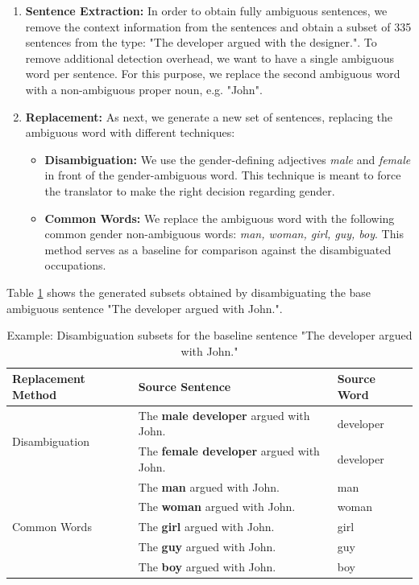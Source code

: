\begin{enumerate}
  \item \textbf{Sentence Extraction:}  
  In order to obtain fully ambiguous sentences, we remove the context information from the sentences and obtain a subset of 335 sentences from the type: "The developer argued with the designer.".
  To remove additional detection overhead, we want to have a single ambiguous word per sentence. For this purpose, we replace the second ambiguous word with a non-ambiguous proper noun, e.g. "John". 
  \item \textbf{Replacement:} 
  As next, we generate a new set of sentences, replacing the ambiguous word with different techniques:
  \begin{itemize}
      \item \textbf{Disambiguation:} We use the gender-defining adjectives \textit{male} and \textit{female} in front of the gender-ambiguous word. This technique is meant to force the translator to make the right decision regarding gender. %
      \item \textbf{Common Words:} We replace the ambiguous word with the following common gender non-ambiguous words: \textit{man, woman, girl, guy, boy}. This method serves as a baseline for comparison against the disambiguated occupations.
  \end{itemize}
\end{enumerate}

Table \ref{tab:preprocessing} shows the generated subsets obtained by disambiguating the base ambiguous sentence "The developer argued with John.".

\begin{table}
    \begin{tabularx}{\linewidth}{|l|X|l|}
        \hline
        \textbf{Replacement Method} & \textbf{Source Sentence} & \textbf{Source Word} \\ \hline
        \multirow{2}{*}{Disambiguation} & The \textbf{male developer} argued with John. & developer \\
        & The \textbf{female developer} argued with John. & developer \\ \hline
        \multirow{5}{*}{Common Words} & The \textbf{man} argued with John. & man \\
        & The \textbf{woman} argued with John. & woman \\
        & The \textbf{girl} argued with John. & girl \\
        & The \textbf{guy} argued with John. & guy \\
        & The \textbf{boy} argued with John. & boy \\ \hline
    \end{tabularx}
    \caption{Example: Disambiguation subsets for the baseline sentence "The developer argued with John."}
    \label{tab:preprocessing}
\end{table}

